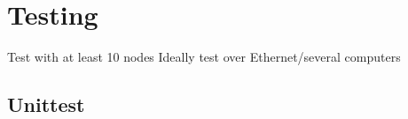 \chapter{Testing}
Test with at least 10 nodes
Ideally test over Ethernet/several computers
\section{Unittest}